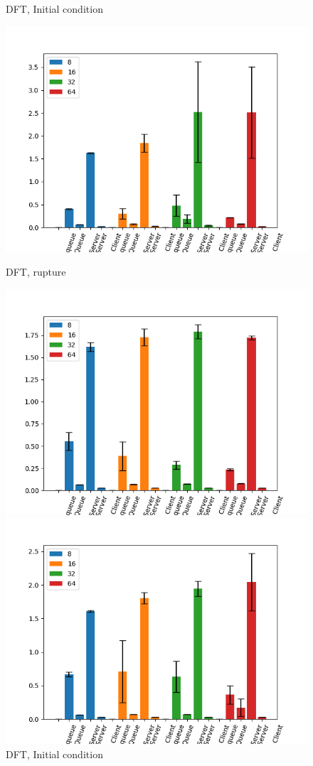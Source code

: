 \documentclass[11pt,a4paper]{article}
\begin{document}
\begin{figure}[H]
\begin{minipage}[b]{0.5\linewidth}
    \caption{DFT, Initial condition} 
    \vspace{4ex}
  \end{minipage}%
  \begin{minipage}[b]{0.5\linewidth}
    \centering
    \includegraphics[width=0.7\linewidth]{img/exp4_1/exp4_1_mw_percentile_plots_writes_1__vc_8.png} 
    \caption{DFT, rupture} 
    \vspace{4ex}
  \end{minipage} 
    \begin{minipage}[b]{0.5\linewidth}
    \centering
    \includegraphics[width=0.7\linewidth]{img/exp4_1/exp4_1_mw_percentile_plots_writes_1__vc_16.png} 
    \caption{DFT, Initial condition} 
    \vspace{4ex}
  \end{minipage}%
  \begin{minipage}[b]{0.5\linewidth}
    \centering
    \includegraphics[width=0.7\linewidth]{img/exp4_1/exp4_1_mw_percentile_plots_writes_1__vc_32.png} 

\end{minipage}
\end{figure}
\end{document}
